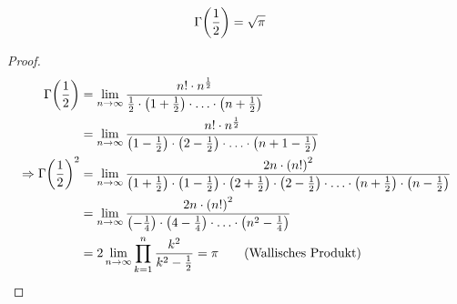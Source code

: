 \begin{satz} %
    \begin{align*}
        \Gamma\of{\frac{1}{2}} &= \sqrt {\pi}
    \end{align*}

    \begin{proof}
        \begin{align*}
            \Gamma\of{\frac{1}{2}} &= \lim_{\ntoinf} \frac{n!\cdot n^{\frac{1}{2}}}{\frac{1}{2}\cdot \pair{1+\frac{1}{2}}\cdot\ldots \cdot \pair{n+\frac{1}{2}}}\\
            &= \lim_{\ntoinf} \frac{n!\cdot n^{\frac{1}{2}}}{\pair{1-\frac{1}{2}}\cdot\pair{2-\frac{1}{2}}\cdot\ldots\cdot \pair{n+1-\frac{1}{2}}}\\
            \impl \Gamma\of{\frac{1}{2}}^{2} &= \lim_{\ntoinf} \frac{2n\cdot \pair{n!}^2}{\pair{1+\frac{1}{2}}\cdot \pair{1-\frac{1}{2}}\cdot\pair{2+\frac{1}{2}}\cdot\pair{2-\frac{1}{2}}\cdot\ldots\cdot \pair{n+\frac{1}{2}}\cdot \pair{n-\frac{1}{2}}}\\
            &= \lim_{\ntoinf} \frac{2n\cdot \pair{n!}^2}{\pair{-\frac{1}{4}}\cdot\pair{4-\frac{1}{4}}\cdot\ldots\cdot\pair{n^2-\frac{1}{4}}}\\
            &= 2\lim_{\ntoinf} \prod_{k=1}^{n} \frac{k^2}{k^2-\frac{1}{2}} = \pi\tag{Wallisches Produkt}
        \end{align*}
    \end{proof}
\end{satz}

\newpage
